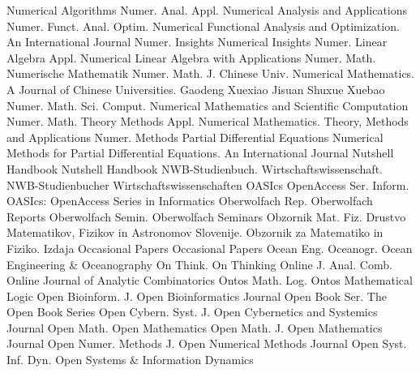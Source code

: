 {Numerical Algorithms}
{Numer. Anal. Appl.}
{Numerical Analysis and Applications}
{Numer. Funct. Anal. Optim.}
{Numerical Functional Analysis and Optimization. An International Journal}
{Numer. Insights}
{Numerical Insights}
{Numer. Linear Algebra Appl.}
{Numerical Linear Algebra with Applications}
{Numer. Math.}
{Numerische Mathematik}
{Numer. Math. J. Chinese Univ.}
{Numerical Mathematics. A Journal of Chinese Universities. Gaodeng Xuexiao Jisuan Shuxue Xuebao}
{Numer. Math. Sci. Comput.}
{Numerical Mathematics and Scientific Computation}
{Numer. Math. Theory Methods Appl.}
{Numerical Mathematics. Theory, Methods and Applications}
{Numer. Methods Partial Differential Equations}
{Numerical Methods for Partial Differential Equations. An International Journal}
{Nutshell Handbook}
{Nutshell Handbook}
{NWB-Studienbuch. Wirtschaftswissenschaft.}
{NWB-Studienbucher Wirtschaftswissenschaften}
{OASIcs OpenAccess Ser. Inform.}
{OASIcs: OpenAccess Series in Informatics}
{Oberwolfach Rep.}
{Oberwolfach Reports}
{Oberwolfach Semin.}
{Oberwolfach Seminars}
{Obzornik Mat. Fiz.}
{Drustvo Matematikov, Fizikov in Astronomov Slovenije. Obzornik za Matematiko in Fiziko. Izdaja}
{Occasional Papers}
{Occasional Papers}
{Ocean Eng. Oceanogr.}
{Ocean Engineering & Oceanography}
{On Think.}
{On Thinking}
{Online J. Anal. Comb.}
{Online Journal of Analytic Combinatorics}
{Ontos Math. Log.}
{Ontos Mathematical Logic}
{Open Bioinform. J.}
{Open Bioinformatics Journal}
{Open Book Ser.}
{The Open Book Series}
{Open Cybern. Syst. J.}
{Open Cybernetics and Systemics Journal}
{Open Math.}
{Open Mathematics}
{Open Math. J.}
{Open Mathematics Journal}
{Open Numer. Methods J.}
{Open Numerical Methods Journal}
{Open Syst. Inf. Dyn.}
{Open Systems & Information Dynamics}
